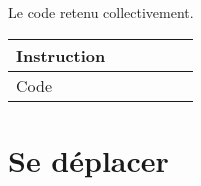 \begin{activite}
\begin{landscape}
\bigskip

\begin{center}
    Le code retenu collectivement.
\end{center}

\begin{tabular}{|p{1.8cm}|*{5}{C{3.8}|}}
   \hline
   Instruction & & & & & \\
   \hline
   \vspace*{0.7cm}
   Code \newline
   \vspace*{1cm}
   & & & & & \\
   \hline
\end{tabular}

\end{landscape}

\end{activite}


\cours 

\section{Se déplacer}
 
